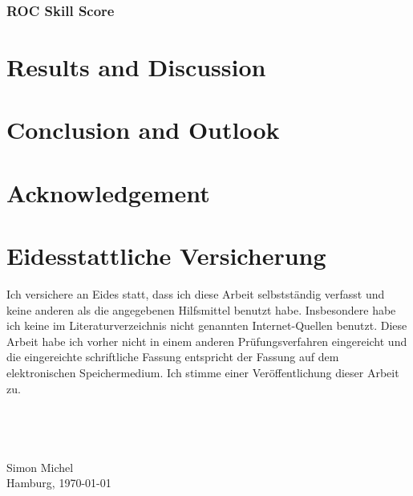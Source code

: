 \documentclass[11pt,twoside,a4paper,fleqn,x11names]{report}
\numberwithin{equation}{chapter}
\numberwithin{figure}{chapter}
\numberwithin{table}{chapter}
\begin{document}
\subsection{ROC Skill Score}
\chapter{Results and Discussion}

\chapter{Conclusion and Outlook}
\chapter{Acknowledgement}

\chapter{Eidesstattliche Versicherung}
Ich versichere an Eides statt, dass ich diese Arbeit selbstständig verfasst und keine anderen als die angegebenen Hilfsmittel benutzt habe. Insbesondere habe ich keine im Literaturverzeichnis nicht genannten Internet-Quellen benutzt. Diese Arbeit habe ich vorher nicht in einem anderen Prüfungsverfahren eingereicht und die eingereichte schriftliche Fassung entspricht der Fassung auf dem elektronischen Speichermedium. Ich stimme einer Veröffentlichung dieser Arbeit zu.
\\
\\
\\
\\
\\
Simon Michel\\
Hamburg, \today
\end{document}
